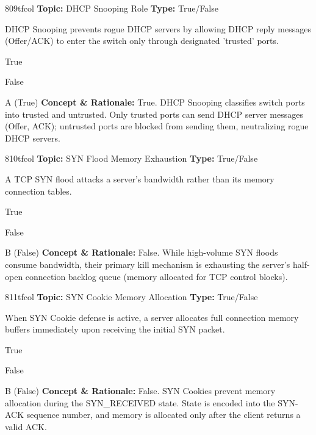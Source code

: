 \begin{qcard}{809}{tfcol}
\textcolor{darkslate!75}{\small\textbf{Topic:} DHCP Snooping Role \hfill \textbf{Type:} True/False}\vspace{0.4em}\par
DHCP Snooping prevents rogue DHCP servers by allowing DHCP reply messages (Offer/ACK) to enter the switch only through designated 'trusted' ports.
\begin{qoptions}
\item True
\item False
\end{qoptions}
\end{qcard}
\nopagebreak
\begin{explainbox}{A (True)}
\textbf{Concept \& Rationale:} True. DHCP Snooping classifies switch ports into trusted and untrusted. Only trusted ports can send DHCP server messages (Offer, ACK); untrusted ports are blocked from sending them, neutralizing rogue DHCP servers.
\end{explainbox}

\begin{qcard}{810}{tfcol}
\textcolor{darkslate!75}{\small\textbf{Topic:} SYN Flood Memory Exhaustion \hfill \textbf{Type:} True/False}\vspace{0.4em}\par
A TCP SYN flood attacks a server's bandwidth rather than its memory connection tables.
\begin{qoptions}
\item True
\item False
\end{qoptions}
\end{qcard}
\nopagebreak
\begin{explainbox}{B (False)}
\textbf{Concept \& Rationale:} False. While high-volume SYN floods consume bandwidth, their primary kill mechanism is exhausting the server's half-open connection backlog queue (memory allocated for TCP control blocks).
\end{explainbox}

\begin{qcard}{811}{tfcol}
\textcolor{darkslate!75}{\small\textbf{Topic:} SYN Cookie Memory Allocation \hfill \textbf{Type:} True/False}\vspace{0.4em}\par
When SYN Cookie defense is active, a server allocates full connection memory buffers immediately upon receiving the initial SYN packet.
\begin{qoptions}
\item True
\item False
\end{qoptions}
\end{qcard}
\nopagebreak
\begin{explainbox}{B (False)}
\textbf{Concept \& Rationale:} False. SYN Cookies prevent memory allocation during the SYN\_RECEIVED state. State is encoded into the SYN-ACK sequence number, and memory is allocated only after the client returns a valid ACK.
\end{explainbox}

